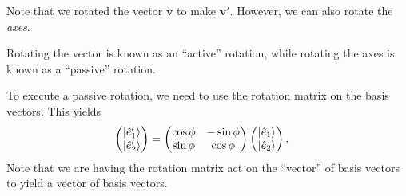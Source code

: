 \documentclass[10pt]{mypackage}
\begin{document}
Note that we rotated the vector $\mathbf{v}$ to make $\mathbf{v}'$. However, we can also rotate the \textit{axes}.\newline

Rotating the vector is known as an ``active'' rotation, while rotating the axes is known as a ``passive'' rotation.\newline

To execute a passive rotation, we need to use the rotation matrix on the basis vectors. This yields
\begin{align*}
  \begin{pmatrix}\ket{\hat{e}_1'}\\\ket{\hat{e}_2'}\end{pmatrix} &= \begin{pmatrix}\cos\phi & -\sin\phi \\ \sin\phi & \cos\phi\end{pmatrix} \begin{pmatrix}\ket{\hat{e}_1}\\\ket{\hat{e}_2}\end{pmatrix}.
\end{align*}
Note that we are having the rotation matrix act on the ``vector'' of basis vectors to yield a vector of basis vectors.
\end{document}
